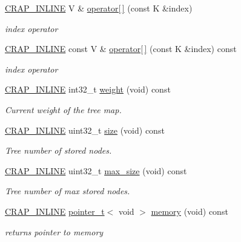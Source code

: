 \begin{DoxyCompactItemize}
\hyperlink{config__x86_8h_a5a40526b8d842e7ff731509998bb0f1c}{C\+R\+A\+P\+\_\+\+I\+N\+L\+I\+N\+E} V \& \hyperlink{classcrap_1_1tree__map_a7f4c3ff977dafbe9c0ba7c7f02cfd065}{operator\mbox{[}$\,$\mbox{]}} (const K \&index)
\begin{DoxyCompactList}\small\item\em index operator \end{DoxyCompactList}\item 
\hyperlink{config__x86_8h_a5a40526b8d842e7ff731509998bb0f1c}{C\+R\+A\+P\+\_\+\+I\+N\+L\+I\+N\+E} const V \& \hyperlink{classcrap_1_1tree__map_a07a5165b7daf95b8e84d3c6d8f1a5c02}{operator\mbox{[}$\,$\mbox{]}} (const K \&index) const 
\begin{DoxyCompactList}\small\item\em index operator \end{DoxyCompactList}\item 
\hyperlink{config__x86_8h_a5a40526b8d842e7ff731509998bb0f1c}{C\+R\+A\+P\+\_\+\+I\+N\+L\+I\+N\+E} int32\+\_\+t \hyperlink{classcrap_1_1tree__map_adc86e2f3c17ca3322523970fbf1405b4}{weight} (void) const 
\begin{DoxyCompactList}\small\item\em Current weight of the tree map. \end{DoxyCompactList}\item 
\hyperlink{config__x86_8h_a5a40526b8d842e7ff731509998bb0f1c}{C\+R\+A\+P\+\_\+\+I\+N\+L\+I\+N\+E} uint32\+\_\+t \hyperlink{classcrap_1_1tree__map_a8f64f41ca15631a937cbca9c8e6fdcec}{size} (void) const 
\begin{DoxyCompactList}\small\item\em Tree number of stored nodes. \end{DoxyCompactList}\item 
\hyperlink{config__x86_8h_a5a40526b8d842e7ff731509998bb0f1c}{C\+R\+A\+P\+\_\+\+I\+N\+L\+I\+N\+E} uint32\+\_\+t \hyperlink{classcrap_1_1tree__map_a94af2fa29c262d2d686d2716ad89e2bf}{max\+\_\+size} (void) const 
\begin{DoxyCompactList}\small\item\em Tree number of max stored nodes. \end{DoxyCompactList}\item 
\hyperlink{config__x86_8h_a5a40526b8d842e7ff731509998bb0f1c}{C\+R\+A\+P\+\_\+\+I\+N\+L\+I\+N\+E} \hyperlink{structcrap_1_1pointer__t}{pointer\+\_\+t}$<$ void $>$ \hyperlink{classcrap_1_1tree__map_a478da4a9798b325ef27494a2c9a178f4}{memory} (void) const 
\begin{DoxyCompactList}\small\item\em returns pointer to memory \end{DoxyCompactList}\end{DoxyCompactItemize}
